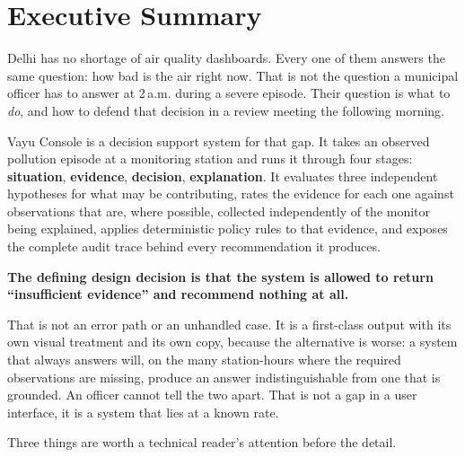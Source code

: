 \documentclass[11pt,a4paper]{article}
\newcommand{\keyclaim}[1]{%
  \par\vspace{0.7ex}\noindent
  \colorbox{vwash}{\parbox{\dimexpr\linewidth-2\fboxsep}{%
    \color{vblack}\textbf{#1}}}%
  \par\vspace{0.9ex}}
\begin{document}
\newpage

\section{Executive Summary}

Delhi has no shortage of air quality dashboards. Every one of them answers the same
question: how bad is the air right now. That is not the question a municipal officer
has to answer at 2\,a.m. during a severe episode. Their question is what to
\emph{do}, and how to defend that decision in a review meeting the following
morning.

Vayu Console is a decision support system for that gap. It takes an observed
pollution episode at a monitoring station and runs it through four stages:
\textbf{situation}, \textbf{evidence}, \textbf{decision}, \textbf{explanation}. It
evaluates three independent hypotheses for what may be contributing, rates the
evidence for each one against observations that are, where possible, collected
independently of the monitor being explained, applies deterministic policy rules to
that evidence, and exposes the complete audit trace behind every recommendation it
produces.

\keyclaim{The defining design decision is that the system is allowed to return
``insufficient evidence'' and recommend nothing at all.}

That is not an error path or an unhandled case. It is a first-class output with its
own visual treatment and its own copy, because the alternative is worse: a system
that always answers will, on the many station-hours where the required observations
are missing, produce an answer indistinguishable from one that is grounded. An
officer cannot tell the two apart. That is not a gap in a user interface, it is a
system that lies at a known rate.

Three things are worth a technical reader's attention before the detail.
\end{document}
